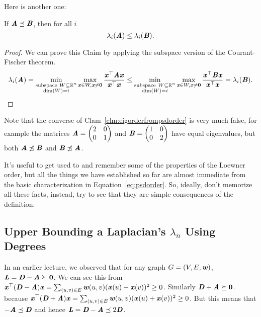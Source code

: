 Here is another one:
\begin{claim}
  \label{clm:eigorderfrompsdorder}
If $\AA \preceq \BB$, then for all $i$
\[
\lambda_i(\AA) \leq \lambda_i(\BB).
\]
\end{claim}
\begin{proof}
  We can prove this Claim by applying the subspace version of the
  Courant-Fischer theorem.
\[
\lambda_i(\AA) =
\min_{
      \substack{
        \mathrm{subspace~} W \subseteq \R^n
        \\
        \dim{W} = i
      }
    }
    \max_{
      \xx \in W, \xx \neq \veczero
    }
    \frac{\xx^\trp \AA\xx}{\xx^\trp\xx}
\leq
 \min_{
      \substack{
        \mathrm{subspace~} W \subseteq \R^n
        \\
        \dim{W} = i
      }
    }
    \max_{
      \xx \in W, \xx \neq \veczero
    }
    \frac{\xx^\trp \BB\xx}{\xx^\trp\xx}
= \lambda_i(\BB).
\]
\end{proof}
Note that the converse of Clam~\ref{clm:eigorderfrompsdorder} is very
much false, for example the matrices
$ \AA =
\begin{pmatrix}
  2 & 0 \\
  0 & 1
\end{pmatrix}$
and $\BB = \begin{pmatrix}
  1 & 0 \\
  0 & 2
\end{pmatrix}$ have equal eigenvalues, but both $\AA \not\preceq \BB$ and
$\BB \not\preceq \AA$.

\begin{remark}
  It's useful to get used to and remember some of the properties of the Loewner
  order, but all the things we have established so far are almost
  immediate from the basic characterization in
  Equation~\eqref{eq:psdorder}.
  So, ideally, don't memorize all these facts, instead, try to see that
  they are simple consequences of the definition.
\end{remark}

\subsection{Upper Bounding a Laplacian's $\lambda_n$ Using Degrees}
In an earlier lecture, we observed that for any graph $G=(V,E,\ww)$,
$\LL = \DD - \AA \succeq \matzero$.
We can see this from
$\xx^\top (\DD-\AA) \xx = \sum_{ (u,v) \in E } \ww(u,v)
( \xx(u) - \xx(v) )^2 \geq 0$.
Similarly $\DD + \AA \succeq \matzero$. because
$\xx^\top (\DD+\AA) \xx = \sum_{ (u,v) \in E } \ww(u,v)
( \xx(u) + \xx(v) )^2 \geq 0$.
But this means that $-\AA \preceq \DD$ and hence $\LL = \DD-\AA
\preceq 2\DD$.

